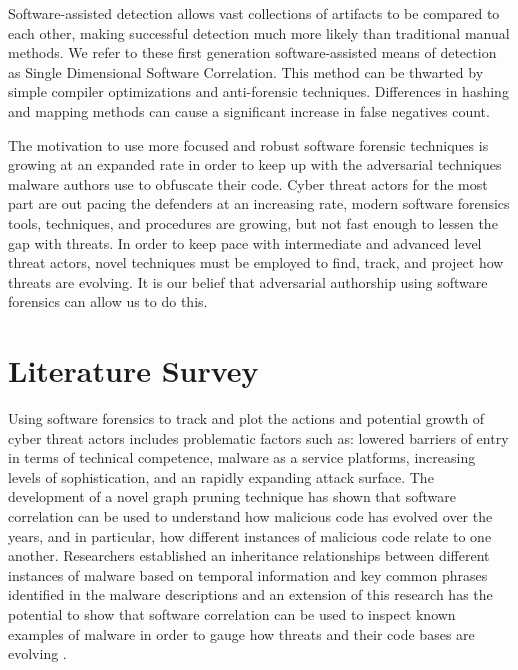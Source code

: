 \documentclass[12pt]{report}
\begin{document}
Software-assisted detection allows vast collections of artifacts to be compared to each other, making successful detection much more likely than traditional manual methods.  We refer to these first generation software-assisted means of detection as Single Dimensional Software Correlation.  This method can be thwarted by simple compiler optimizations and anti-forensic techniques.  Differences in hashing and mapping methods can cause a significant increase in false negatives count.

The motivation to use more focused and robust software forensic techniques is growing at an expanded rate in order to keep up with the adversarial techniques malware authors use to obfuscate their code.  Cyber threat actors for the most part are out pacing the defenders at an increasing rate, modern software forensics tools, techniques, and procedures are growing, but not fast enough to lessen the gap with threats.  In order to keep pace with intermediate and advanced level threat actors, novel techniques must be employed to find, track, and project how threats are evolving.  It is our belief that adversarial authorship using software forensics can allow us to do this.

\chapter{Literature Survey}
\label{chap:two}
Using software forensics to track and plot the actions and potential growth of cyber threat actors includes problematic factors such as: lowered barriers of entry in terms of technical competence, malware as a service platforms, increasing levels of sophistication, and an rapidly expanding attack surface.  The development of a novel graph pruning technique has shown that software correlation can be used to understand how malicious code has evolved over the years, and in particular, how different instances of malicious code relate to one another.  Researchers established an inheritance relationships between different instances of malware based on temporal information and key common phrases identified in the malware descriptions and an extension of this research has the potential to show that software correlation can be used to inspect known examples of malware in order to gauge how threats and their code bases are evolving \cite{gupta2009empirical}.
\end{document}
